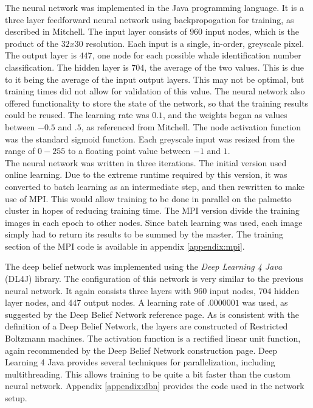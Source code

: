 \documentclass[10pt]{IEEEtran}
\newcommand{\?}{\stackrel{?}{=}}
\begin{document}
The neural network was implemented in the Java programming language. It is a 
three layer feedforward neural network using backpropogation for training, as
described in Mitchell\cite{mitchell}. The input layer consists of $960$ input
nodes, which is the product of the $32x30$ resolution. Each input is a single,
in-order, greyscale pixel. The output layer is $447$, one node for each possible whale
identification number classification. The hidden layer is $704$, the average
of the two values. This is due to it being the average of the input output 
layers. This may not be optimal, but training times did not allow for 
validation of this value. The neural network also offered functionality to 
store the state of the network, so that the training results could be reused. 
The learning rate was $0.1$, and the weights began as values between $-0.5$ 
and $.5$, as referenced from Mitchell\cite{mitchell}. The node activation function
was the standard sigmoid function\cite{mitchell}. Each greyscale input was resized
from the range of $0-255$ to a floating point value between $-1$ and $1$.\\
The neural network was written in three iterations. The initial version used
online learning. Due to the extreme runtime required by this version, it was
converted to batch learning as an intermediate step, and then rewritten to make
use of MPI. This would allow training to be done in parallel on the palmetto
cluster in hopes of reducing training time. The MPI version divide the training
images in each epoch to other nodes. Since batch learning was used, each 
image simply had to return its results to be summed by the master. The training 
section of the MPI code is available in appendix \ref{appendix:mpi}.

The deep belief network was implemented using the \textit{Deep Learning 4 Java} (DL4J)
library\cite{dl4j}. The configuration of this network is very similar to the 
previous neural network. It again consists three layers with $960$ input nodes,
 $704$ hidden layer nodes, and $447$ output nodes. A learning rate of $.0000001$
 was used, as suggested by the Deep Belief Network reference page\cite{dbn}. 
 As is consistent with the definition of a Deep Belief Network, the layers
 are constructed of Restricted Boltzmann machines\cite{dbn}. The activation function is a
 rectified linear unit function, again recommended by the Deep Belief Network
 construction page\cite{dbn}. Deep Learning 4 Java provides several techniques
 for parallelization, including multithreading\cite{scaleout}. This allows training to be 
quite a bit faster than the custom neural network. Appendix \ref{appendix:dbn} provides the
code used in the network setup. 
\end{document}

